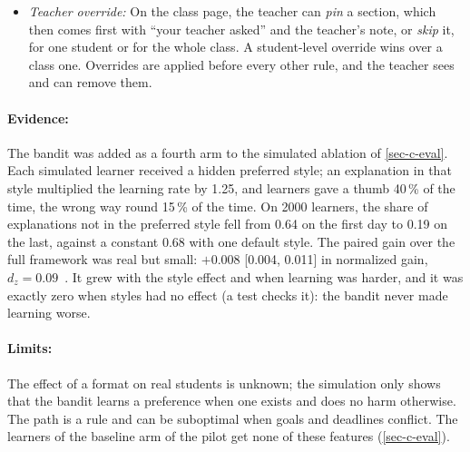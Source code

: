 \begin{itemize}
        (weight 0.5) when the learner's next quiz answer on that section,
        within 24 hours, is correct. Exercise questions always get hints,
        as before. The choice is shown as an agent step (``style: worked
        example'') and traced. These are \emph{formats chosen from
        feedback}, not learning styles diagnosed from a questionnaire: the
        matching hypothesis has no adequate evidence~\cite{pashler2008},
        and the system makes no claim about the learner's type
        (\cref{subsec-foundations}).
  \item \emph{Teacher override:} On the class page, the teacher can
        \emph{pin} a section, which then comes first with ``your teacher
        asked'' and the teacher's note, or \emph{skip} it, for one student
        or for the whole class. A student-level override wins over a class
        one. Overrides are applied before every other rule, and the teacher
        sees and can remove them.
\end{itemize}

\paragraph{Evidence:} The bandit was added as a fourth arm to the
simulated ablation of \cref{sec-c-eval}. Each simulated learner received
a hidden preferred style; an explanation in that style multiplied the
learning rate by 1.25, and learners gave a thumb 40\,\% of the time, the
wrong way round 15\,\% of the time. On 2000 learners, the share of
explanations not in the preferred style fell from 0.64 on the first day
to 0.19 on the last, against a constant 0.68 with one default style. The
paired gain over the full framework was real but small: $+0.008$
[0.004, 0.011] in normalized gain, $d_z = 0.09$~\cite{cohen1988}. It grew
with the style effect and when learning was harder, and it was exactly
zero when styles had no effect (a test checks it): the bandit never made
learning worse.

\paragraph{Limits:} The effect of a format on real students is unknown;
the simulation only shows that the bandit learns a preference when one
exists and does no harm otherwise. The path is a rule and can be
suboptimal when goals and deadlines conflict. The learners of the
baseline arm of the pilot get none of these features (\cref{sec-c-eval}).

